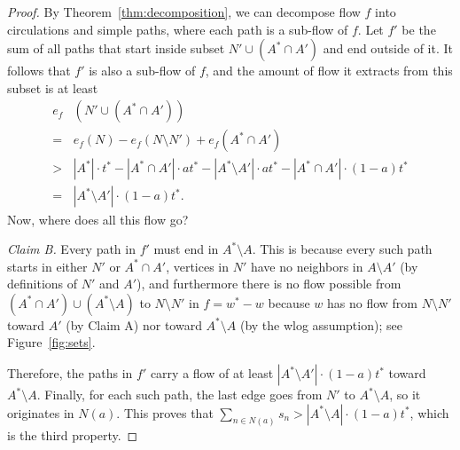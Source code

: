 \begin{proof}
By Theorem~\ref{thm:decomposition}, we can decompose flow $f$ into circulations and simple paths, where each path is a sub-flow of $f$. 
Let $f'$ be the sum of all paths that start inside subset $N'\cup(A^*\cap A')$ and end outside of it. 
It follows that $f'$ is also a sub-flow of $f$, and the amount of flow it extracts from this subset is at least
\begin{align*}
e_f & (N'\cup(A^*\cap A')) \\
=& e_f(N) - e_f(N\setminus N') + e_f(A^*\cap A') \\
>& |A^*|\cdot t^* - |A^*\cap A'|\cdot a t^* - |A^*\setminus A'|\cdot at^* - |A^*\cap A'|\cdot (1-a)t^* \\
=& |A^*\setminus A'|\cdot (1-a)t^*.
\end{align*}
Now, where does all this flow go?

\emph{Claim B.} Every path in $f'$ must end in $A^*\setminus A$. 
This is because every such path starts in either $N'$ or $A^*\cap A'$, vertices in $N'$ have no neighbors in $A\setminus A'$ (by definitions of $N'$ and $A'$), and furthermore there is no flow possible from $(A^*\cap A')\cup (A^*\setminus A)$ to $N\setminus N'$ in $f=w^*-w$ because $w$ has no flow from $N\setminus N'$ toward $A'$ (by Claim A) nor toward $A^*\setminus A$ (by the wlog assumption); see Figure~\ref{fig:sets}. 

Therefore, the paths in $f'$ carry a flow of at least $|A^* \setminus A'|\cdot (1-a)t^*$ toward $A^*\setminus A$. 
Finally, for each such path, the last edge goes from $N'$ to $A^*\setminus A$, so it originates in $N(a)$. 
This proves that $\sum_{n\in N(a)} s_n> |A^* \setminus A|\cdot (1-a) t^*$, which is the third property.
\end{proof}